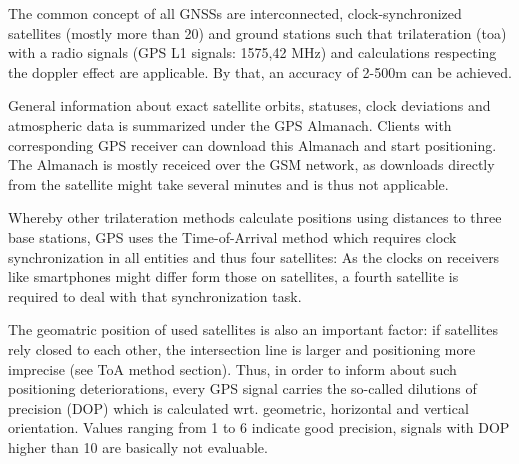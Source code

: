 

The common concept of all GNSSs are interconnected, clock-synchronized satellites (mostly more than 20) and ground stations such that trilateration (\ac{toa}) with a radio signals (GPS L1 signals: 1575,42 MHz) and calculations respecting the doppler effect are applicable. By that, an accuracy of 2-500m can be achieved.

General information about exact satellite orbits, statuses, clock deviations and atmospheric data is summarized under the GPS Almanach. Clients with corresponding GPS receiver can download this Almanach and start positioning. The Almanach is mostly receiced over the GSM network, as downloads directly from the satellite might take several minutes and is thus not applicable.

Whereby other trilateration methods calculate positions using distances to three base stations, GPS uses the Time-of-Arrival method which requires clock synchronization in all entities and thus four satellites: As the clocks on receivers like smartphones might differ form those on satellites, a fourth satellite is required to deal with that synchronization task. \cite[p. 58]{hybridizationGNSSPhd}

The geomatric position of used satellites is also an important factor: if satellites rely closed to each other, the intersection line is larger and positioning more imprecise (see ToA method section). Thus, in order to inform about such positioning deteriorations, every GPS signal carries the so-called dilutions of precision (DOP) which is calculated wrt. geometric, horizontal and vertical orientation. Values ranging from 1 to 6 indicate good precision, signals with DOP higher than 10 are basically not evaluable.

